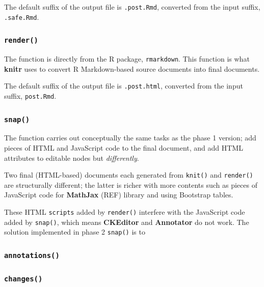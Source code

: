 \documentclass[a4paper, 12pt]{report}
\begin{document}
The default suffix of the output file is \texttt{.post.Rmd}, converted from the input suffix, \texttt{.safe.Rmd}.

\subsubsection*{\texttt{render()}}
The function is directly from the R package, \texttt{rmarkdown}. This function is what \textbf{knitr} uses to convert R Markdown-based source documents into final documents.

The default suffix of the output file is \texttt{.post.html}, converted from the input suffix, \texttt{post.Rmd}.

\subsubsection*{\texttt{snap()}}
The function carries out conceptually the same tasks as the phase 1 version; add pieces of HTML and JavaScript code to the final document, and add HTML attributes to editable nodes but \emph{differently}.

Two final (HTML-based) documents each generated from \texttt{knit()} and \texttt{render()} are structurally different; the latter is  richer with more contents such as pieces of JavaScript code for \textbf{MathJax} (REF) library and using Bootstrap tables.

These HTML \texttt{scripts} added by \texttt{render()} interfere with the JavaScript code added by \texttt{snap()}, which means \textbf{CKEditor} and \textbf{Annotator} do not work. The solution implemented in phase 2 \texttt{snap()} is to 

\subsubsection*{\texttt{annotations()}}

\subsubsection*{\texttt{changes()}}

\end{document}
